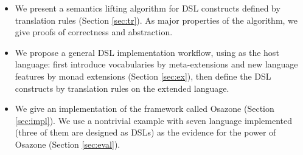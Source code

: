 \begin{itemize}
  \item We present a semantics lifting algorithm for DSL constructs defined by translation rules (Section \ref{sec:tr}).
    As major properties of the algorithm, we give proofs of correctness and abstraction. 
  \item We propose a general DSL implementation workflow, using \STLC{} as the host language:
    first introduce vocabularies by meta-extensions and new language features by monad extensions (Section \ref{sec:ex}),
    then define the DSL constructs by translation rules on the extended language.
  \item We give an implementation of the framework called Osazone (Section \ref{sec:impl}).
    We use a nontrivial example with seven language implemented (three of them are designed as DSLs) as the evidence for the power of Osazone (Section \ref{sec:eval}).
\end{itemize}


